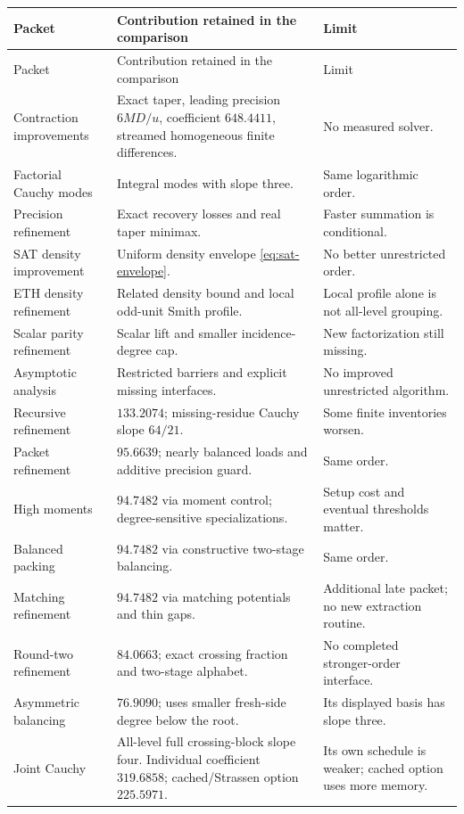 \documentclass[11pt,letterpaper]{article}
\theoremstyle{definition}\newtheorem{definition}[theorem]{Definition}
\theoremstyle{remark}\newtheorem{remark}[theorem]{Remark}
\begin{document}
\small
\begin{longtable}{@{}p{}p{}p{}@{}}
\toprule Packet & Contribution retained in the comparison & Limit\\\midrule
\endfirsthead
\toprule Packet & Contribution retained in the comparison & Limit\\\midrule\endhead
Contraction improvements & Exact taper, leading precision $6MD/u$, coefficient
$648.4411$, streamed homogeneous finite differences. & No measured solver.\\[4pt]
Factorial Cauchy modes & Integral modes with slope three. & Same logarithmic order.\\[4pt]
Precision refinement & Exact recovery losses and real taper minimax. & Faster summation is conditional.\\[4pt]
SAT density improvement & Uniform density envelope \eqref{eq:sat-envelope}. & No better unrestricted order.\\[4pt]
ETH density refinement & Related density bound and local odd-unit Smith profile. & Local profile alone is not all-level grouping.\\[4pt]
Scalar parity refinement & Scalar lift and smaller incidence-degree cap. & New factorization still missing.\\[4pt]
Asymptotic analysis & Restricted barriers and explicit missing interfaces. & No improved unrestricted algorithm.\\[4pt]
Recursive refinement & $133.2074$; missing-residue Cauchy slope $64/21$. & Some finite inventories worsen.\\[4pt]
Packet refinement & $95.6639$; nearly balanced loads and additive precision guard. & Same order.\\[4pt]
High moments & $94.7482$ via moment control; degree-sensitive specializations. & Setup cost and eventual thresholds matter.\\[4pt]
Balanced packing & $94.7482$ via constructive two-stage balancing. & Same order.\\[4pt]
Matching refinement & $94.7482$ via matching potentials and thin gaps. & Additional late packet; no new extraction routine.\\[4pt]
Round-two refinement & $84.0663$; exact crossing fraction and two-stage alphabet. & No completed stronger-order interface.\\[4pt]
Asymmetric balancing & $76.9090$; uses smaller fresh-side degree below the root. & Its displayed basis has slope three.\\[4pt]
Joint Cauchy & All-level full crossing-block slope four. Individual coefficient
$319.6858$; cached/Strassen option $225.5971$. & Its own schedule is weaker; cached option uses more memory.\\
\bottomrule
\end{longtable}
\normalsize
\end{document}
